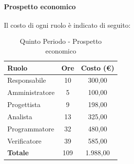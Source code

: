 \documentclass[../PianoDiProgetto_v4.0.0.tex]{subfiles}
\begin{document}
			\newpage
			\paragraph{Prospetto economico}
			Il costo di ogni ruolo è indicato di seguito:
			\begin{table}[h]
				\centering
				\begin{tabular}{l * {2}{c}}
				\toprule
				\textbf{Ruolo} & \textbf{Ore} & \textbf{Costo (\euro{})} \\
				\midrule
				Responsabile & 10 & 300,00 \\
				Amministratore & 5 & 100,00 \\
				Progettista & 9 & 198,00 \\
				Analista & 13 & 325,00 \\		
				Programmatore & 32 & 480,00 \\		
				Verificatore & 39 & 585,00 \\				
				\midrule		
				\textbf{Totale} & 109 & 1.988,00 \\
				\bottomrule	
				\end{tabular}
				\caption{Quinto Periodo - Prospetto economico}		
			\end{table}
			
\end{document}
